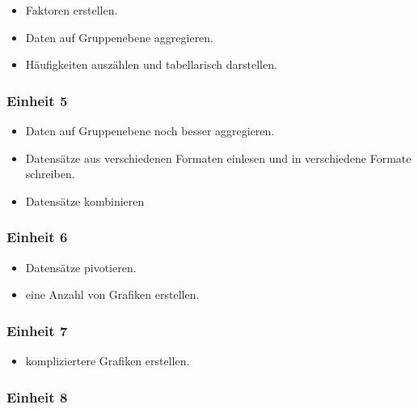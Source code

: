 \documentclass[
]{book}
\providecommand{\tightlist}{%
  \setlength{\itemsep}{0pt}\setlength{\parskip}{0pt}}
\begin{document}
\begin{itemize}
\tightlist
\item
  Faktoren erstellen.
\item
  Daten auf Gruppenebene aggregieren.
\item
  Häufigkeiten auszählen und tabellarisch darstellen.
\end{itemize}

\hypertarget{einheit-5}{%
\subsubsection*{Einheit 5}\label{einheit-5}}

\begin{itemize}
\tightlist
\item
  Daten auf Gruppenebene noch besser aggregieren.
\item
  Datensätze aus verschiedenen Formaten einlesen und in verschiedene Formate schreiben.
\item
  Datensätze kombinieren
\end{itemize}

\hypertarget{einheit-6}{%
\subsubsection*{Einheit 6}\label{einheit-6}}

\begin{itemize}
\tightlist
\item
  Datensätze pivotieren.
\item
  eine Anzahl von Grafiken erstellen.
\end{itemize}

\hypertarget{einheit-7}{%
\subsubsection*{Einheit 7}\label{einheit-7}}

\begin{itemize}
\tightlist
\item
  kompliziertere Grafiken erstellen.
\end{itemize}

\hypertarget{einheit-8}{%
\subsubsection*{Einheit 8}\label{einheit-8}}
\end{document}
